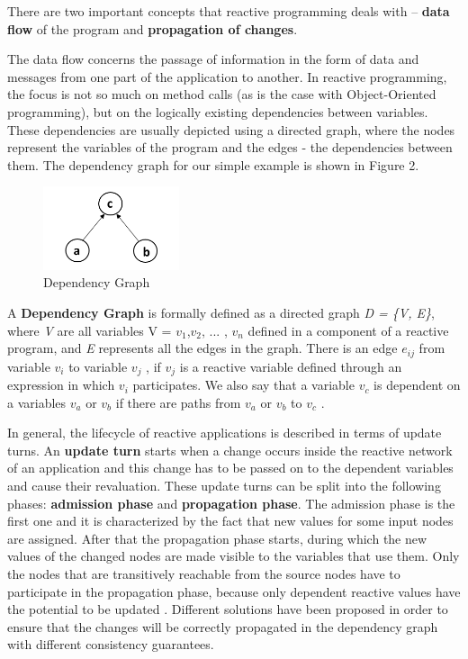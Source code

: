\documentclass{sigplanconf}
\begin{document}
There are two important concepts that reactive programming deals with -- \textbf{data flow} of the program and \textbf{propagation of changes}.

The data flow concerns the passage of information in the form of data and messages from one part of the application to another. In reactive programming, the focus is not so much on method calls (as is the case with Object-Oriented programming), but on the logically existing dependencies between variables. These dependencies are usually depicted using a directed graph, where the nodes represent the variables of the program and the edges - the dependencies between them. The dependency graph for our simple example is shown in Figure 2.

\begin{figure}
\centering
\includegraphics[width=4cm]{dependencyGraph}
\caption{Dependency Graph}
\end{figure}

A \textbf{Dependency Graph} is formally defined as a directed graph \textit{D = \{V, E\}}, where \textit{V} are all variables V = $v_{1}$,$ v_{2}$, ... , $v_{n}$  defined in a component of a reactive program, and \textit{E} represents all the edges in the graph. There is an edge $e_{ij}$ from variable $v_{ i}$ to variable $v_{j}$ , if  $v_{j}$ is a reactive variable defined through an expression in which $v_{i}$ participates.  We also say that a variable $v_{c}$ is dependent on a variables $v_{a}$ or $v_{b}$ if there are paths from $v_{a}$ or $v_{b}$ to $v_{c}$ \cite{dream}.

In general, the lifecycle of reactive applications is described in terms of update turns.  An \textbf{update turn} starts when a change occurs inside the reactive network of an application and this change has to be passed on to the dependent variables and cause their revaluation. These update turns can be split into the following phases: \textbf{admission phase} and \textbf{propagation phase}. The admission phase is the first one and it is characterized by the fact that new values for some input nodes are assigned. After that the propagation phase starts, during which the new values of the changed nodes are made visible to the variables that use them. Only the nodes that are transitively reachable from the source nodes have to participate in the propagation phase, because only dependent reactive values have the potential to be updated \cite{sidup}. Different solutions have been proposed in order to ensure that the changes will be correctly propagated in the dependency graph with different consistency guarantees.
\end{document}
